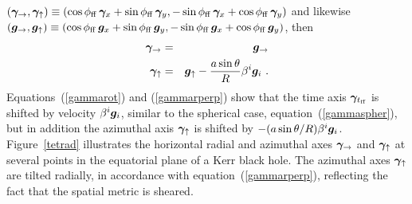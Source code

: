 \documentclass[twocolumn,showpacs,preprintnumbers,amsmath,amssymb,prb]{revtex4}
\begin{document}
$(\gammavec_\rightarrow, \gammavec_\uparrow) \equiv
(\cos \phi_\ff \, \gammavec_x + \sin \phi_\ff \, \gammavec_y ,
\discretionary{}{}{}
- \sin \phi_\ff \, \gammavec_x + \cos \phi_\ff \, \gammavec_y)$
and likewise
$(\gvec_\rightarrow, \gvec_\uparrow) \equiv
(\cos \phi_\ff \, \gvec_x + \sin \phi_\ff \, \gvec_y ,
\discretionary{}{}{}
- \sin \phi_\ff \, \gvec_x + \cos \phi_\ff \, \gvec_y)$,
then
\begin{eqnarray}
\label{gammarperp}
  \bm{\gamma}_\rightarrow
  &=&
  \bm{g}_\rightarrow
\nonumber
\\
  \bm{\gamma}_\uparrow
  &=&
  \bm{g}_\uparrow
  -
  {a \sin\theta \over R}
  \beta^i \bm{g}_i
  \ .
\end{eqnarray}
Equations~(\ref{gammarot}) and (\ref{gammarperp})
show that the time axis
$\bm{\gamma}_{t_{\rm ff}}$
is shifted by velocity $\beta^i \bm{g}_i$,
similar to the spherical case,
equation~(\ref{gammaspher}),
but in addition the azimuthal axis $\bm{\gamma}_\uparrow$
is shifted by $- ( a \sin\theta / R ) \beta^i \bm{g}_i$.
Figure~\ref{tetrad} illustrates the
horizontal radial and azimuthal axes
$\bm{\gamma}_\rightarrow$ and $\bm{\gamma}_\uparrow$
at several points
in the equatorial plane of a Kerr black hole.
The azimuthal axes $\bm{\gamma}_\uparrow$ are tilted radially,
in accordance with equation~(\ref{gammarperp}),
reflecting the fact that the spatial metric is sheared.

\tetradfig
\end{document}
